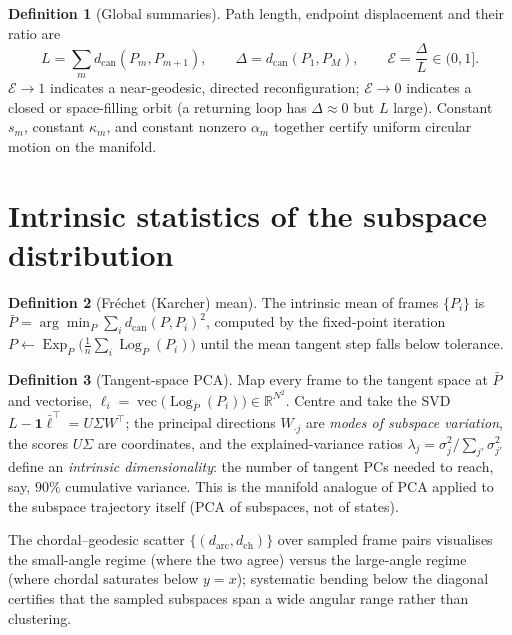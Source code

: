 \documentclass[11pt]{article}
\newcommand{\R}{\mathbb{R}}
\newcommand{\Log}{\operatorname{Log}}
\newcommand{\Exp}{\operatorname{Exp}}
\theoremstyle{definition}
\newtheorem{definition}{Definition}
\begin{document}
\begin{definition}[Global summaries]
Path length, endpoint displacement and their ratio are
\begin{equation}
L = \sum_{m} d_{\mathrm{can}}(P_m,P_{m+1}),\qquad
\Delta = d_{\mathrm{can}}(P_1,P_M),\qquad
\mathcal{E} = \frac{\Delta}{L}\in(0,1].
\end{equation}
$\mathcal{E}\to 1$ indicates a near-geodesic, directed reconfiguration; $\mathcal{E}\to 0$
indicates a closed or space-filling orbit (a returning loop has $\Delta\approx 0$ but
$L$ large). Constant $s_m$, constant $\kappa_m$, and constant nonzero $\alpha_m$
together certify uniform circular motion on the manifold.
\end{definition}

\section{Intrinsic statistics of the subspace distribution}
\label{sec:tpca}

\begin{definition}[Fr\'echet (Karcher) mean]
The intrinsic mean of frames $\{P_i\}$ is
$\bar P = \arg\min_{P} \sum_i d_{\mathrm{can}}(P,P_i)^2$, computed by the fixed-point
iteration
$P \leftarrow \Exp_P\!\big(\tfrac{1}{n}\sum_i \Log_P(P_i)\big)$ until the mean
tangent step falls below tolerance.
\end{definition}

\begin{definition}[Tangent-space PCA]
Map every frame to the tangent space at $\bar P$ and vectorise,
$\bm{\ell}_i = \operatorname{vec}\big(\Log_{\bar P}(P_i)\big)\in\R^{N^2}$. Centre and
take the SVD $L-\mathbf{1}\bar{\bm{\ell}}^\top = U\Sigma W^\top$; the principal
directions $W_{\cdot j}$ are \emph{modes of subspace variation}, the scores
$U\Sigma$ are coordinates, and the explained-variance ratios
$\lambda_j = \sigma_j^2/\sum_{j'}\sigma_{j'}^2$ define an \emph{intrinsic
dimensionality}: the number of tangent PCs needed to reach, say, $90\%$ cumulative
variance. This is the manifold analogue of PCA applied to the subspace trajectory
itself (PCA of subspaces, not of states).
\end{definition}

The chordal--geodesic scatter $\{(d_{\mathrm{arc}},d_{\mathrm{ch}})\}$ over sampled
frame pairs visualises the small-angle regime (where the two agree) versus the
large-angle regime (where chordal saturates below $y=x$); systematic bending below
the diagonal certifies that the sampled subspaces span a wide angular range rather
than clustering.
\end{document}

